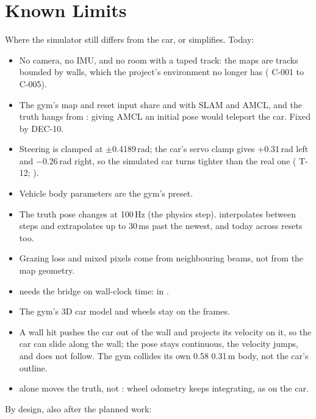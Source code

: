 \documentclass[11pt,a4paper]{article}
\newcommand{\planned}{\target{Planned}}
\begin{document}
\section{Known Limits}
Where the simulator still differs from the car, or simplifies. Today:
\begin{itemize}
  \item No camera, no IMU, and no room with a taped track: the maps are tracks bounded by walls, which the project's environment no longer has ( C-001 to C-005).
  \item The gym's map and reset input share  and  with SLAM and AMCL, and the truth hangs from : giving AMCL an initial pose would teleport the car. Fixed by DEC-10.
  \item Steering is clamped at $\pm$0.4189\,rad; the car's servo clamp gives +0.31\,rad left and $-$0.26\,rad right, so the simulated car turns tighter than the real one ( T-12;  \planned).
  \item Vehicle body parameters are the gym's  preset.
  \item The truth pose changes at 100\,Hz (the physics step).  interpolates between steps and extrapolates up to 30\,ms past the newest, and today across resets too.
  \item Grazing loss and mixed pixels come from neighbouring beams, not from the map geometry.
  \item {} needs the bridge on wall-clock time:  in .
  \item The gym's 3D car model and wheels stay on the  frames.
  \item A wall hit pushes the car out of the wall and projects its velocity on it, so the car can slide along the wall; the pose stays continuous, the velocity jumps, and  does not follow. The gym collides its own 0.58\,\x\,0.31\,m body, not the car's outline.
  \item {} alone moves the truth, not : wheel odometry keeps integrating, as on the car.
\end{itemize}
By design, also after the planned work:
\end{document}
